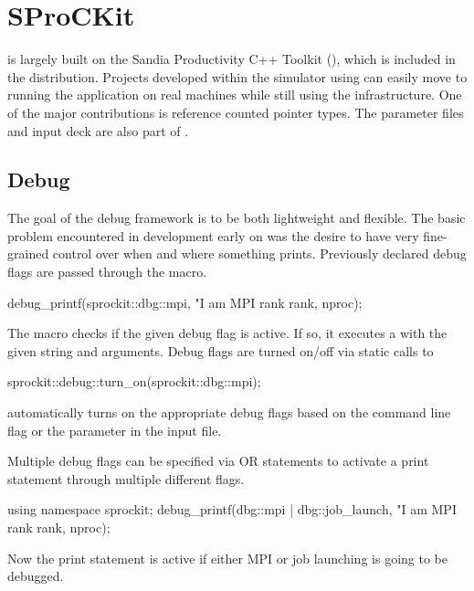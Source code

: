 
\chapter{SProCKit}
\sstmacro is largely built on the Sandia Productivity C++ Toolkit (\sprockit),
which is included in the \sstmacro distribution.
Projects developed within the simulator using \sprockit can easily 
move to running the application on real machines while still using the \sprockit infrastructure.
One of the major contributions is reference counted pointer types.
The parameter files and input deck are also part of \sprockit.

\section{Debug}
The goal of the \sprockit debug framework is to be both lightweight and flexible.
The basic problem encountered in \sstmacro development early on was the desire to have very fine-grained control over when and where something prints.
Previously declared debug flags are passed through the  macro.

\begin{CppCode}
debug_printf(sprockit::dbg::mpi,
  "I am MPI rank %
  rank, nproc);
\end{CppCode}

The macro checks if the given debug flag is active. 
If so, it executes a  with the given string and arguments.
Debug flags are turned on/off via static calls to

\begin{CppCode}
sprockit::debug::turn_on(sprockit::dbg::mpi);
\end{CppCode}

\sstmacro automatically turns on the appropriate debug flags based on the  command line flag
or the  parameter in the input file.

Multiple debug flags can be specified via OR statements to activate a print statement through multiple different flags.

\begin{CppCode}
using namespace sprockit;
debug_printf(dbg::mpi | dbg::job_launch,
  "I am MPI rank %
  rank, nproc);
\end{CppCode}

Now the print statement is active if either MPI or job launching is going to be debugged.

